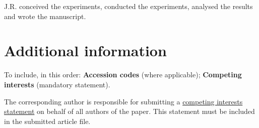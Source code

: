 \documentclass[fleqn,10pt]{wlscirep}
\begin{document}
J.R. conceived the experiments, conducted the experiments, analysed the results and wrote the manuscript. 

\section*{Additional information}

To include, in this order: \textbf{Accession codes} (where applicable); \textbf{Competing interests} (mandatory statement). 

The corresponding author is responsible for submitting a \href{http://www.nature.com/srep/policies/index.html#competing}{competing interests statement} on behalf of all authors of the paper. This statement must be included in the submitted article file.
\end{document}
